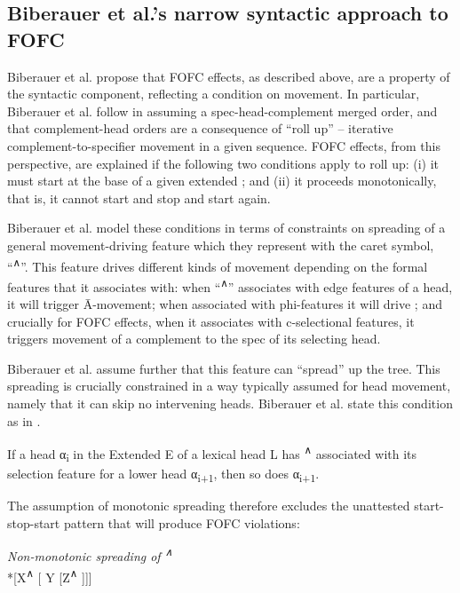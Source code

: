 \documentclass[output=paper]{langscibook}
\begin{document}
\subsection{Biberauer et al.'s narrow syntactic approach to FOFC}  
 
Biberauer et al. propose that FOFC effects, as described above, are  a property of the syntactic component, reflecting a condition on movement.  In particular, Biberauer et al. follow \citet{Kayne1994} in assuming a  spec-head-complement merged order, and that complement-head orders are a consequence of ``roll up'' -- iterative complement-to-specifier movement in a given sequence.  FOFC effects, from this perspective, are explained if the following two conditions apply to roll up: (i) it must start at the base of a given extended ; and (ii) it proceeds monotonically, that is, it cannot start and stop and start again.

Biberauer et al. model these conditions in terms of constraints on spreading of a general movement-driving feature which they represent with the caret symbol, ``\textsuperscript{∧}''.  This feature drives different kinds of movement depending on the formal features that it associates with:  when ``\textsuperscript{∧}'' associates with edge features of a  head, it will trigger Ā-movement; when associated with phi-features it will drive ; and crucially for FOFC effects, when it associates with c-selectional features, it triggers movement of a complement to the spec of its selecting head.
 
Biberauer et al. assume further that this feature can ``spread'' up the tree.  This spreading is crucially constrained in a way typically assumed for head movement, namely that it can skip no intervening heads.  Biberauer et al. state this condition as in .
   
\ea\label{ex:haddican:10} 	If a head α\textsubscript{i} in the Extended  E of a lexical head L has \textsuperscript{∧} associated with its selection feature for a lower head α\textsubscript{i+1}, then so does α\textsubscript{i+1}.
\z

The assumption of monotonic spreading therefore excludes the unattested start-stop-start pattern that will produce FOFC violations:
 
\ea \textit{Non-monotonic spreading of \textsuperscript{∧}}\\ \protect\label{haddican:wedge} *[X\textsuperscript{∧}  [ Y [Z\textsuperscript{∧} ]]] \z
\end{document}
